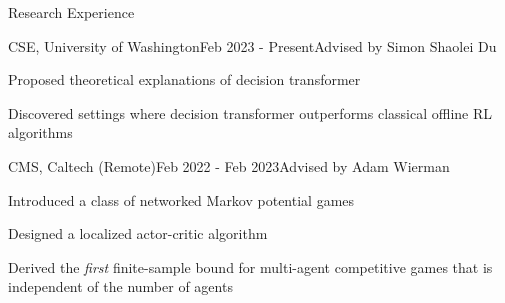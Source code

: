 \documentclass[]{cv}
\begin{document}
\begin{section}{Research Experience}

    \begin{subsection3}{CSE, University of Washington}{Feb 2023 - Present}{Advised by Simon Shaolei Du}
        \item Proposed theoretical explanations of decision transformer
        \item Discovered settings where decision transformer outperforms classical offline RL algorithms
    \end{subsection3}

    \begin{subsection3}{CMS, Caltech (Remote)}{Feb 2022 - Feb 2023}{Advised by Adam Wierman}
        \item Introduced a class of networked Markov potential games
        \item Designed a localized actor-critic algorithm
        \item Derived the \emph{first} finite-sample bound for multi-agent competitive games 
        that is independent of the number of agents
    \end{subsection3}
    

    
    
\end{section}

\end{document}
